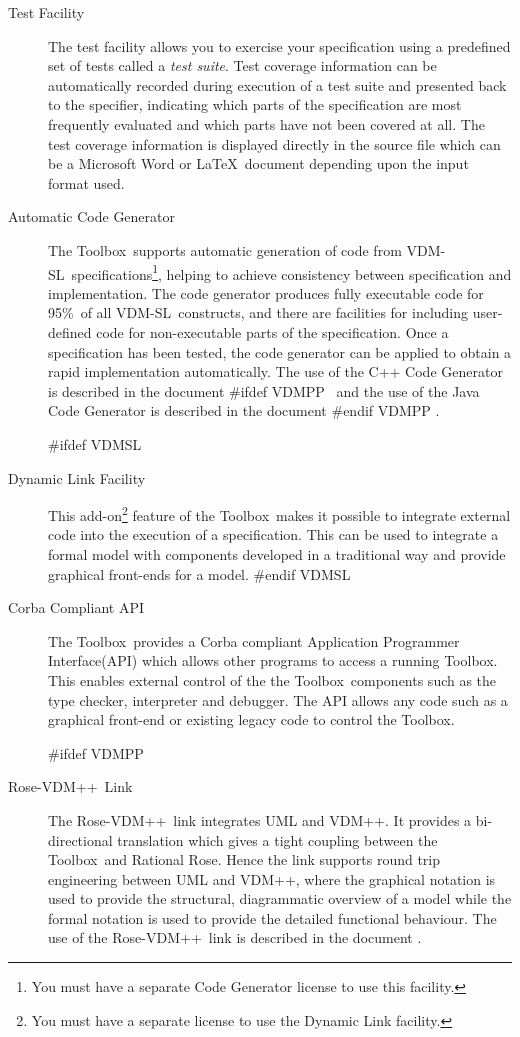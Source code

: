 \documentclass[\pformat,12pt]{article}
\def\vdmpp{{\small VDM}++}
\newcommand{\vdmslpp}{VDM-SL}
\newcommand{\Toolbox}{Toolbox}
\newcommand{\vdmslpp}{VDM++}
\newcommand{\Toolbox}{Toolbox}
\begin{document}
\begin{description}
\item[Test Facility] The test facility allows you to exercise your
  specification using a predefined set of tests called a {\em test
    suite\/}. Test coverage information can be automatically recorded
  during execution of a test suite and presented back to the
  specifier, indicating which parts of the specification are most
  frequently evaluated and which parts have not been covered at all.
  The test coverage information is displayed directly in the source
  file which can be a Microsoft Word or \LaTeX\ document depending
  upon the input format used.

\item[Automatic Code Generator] The \Toolbox\ supports automatic
  generation of  code
  from \vdmslpp\ specifications\footnote{You must have a separate Code
    Generator license to use this facility.}, helping to achieve
  consistency between specification and implementation. The code
  generator produces fully executable code for 95\%\ of all \vdmslpp\
  constructs, and there are facilities for including user-defined code
  for non-executable parts of the specification.  Once a specification
  has been tested, the code generator can be applied to obtain a rapid
  implementation automatically. The use of the C++ Code Generator is
  described in the document
#ifdef VDMPP
\ and the use of the Java Code Generator is described in the document
\cite{CGJavaManPP-CSK}%
#endif VDMPP
.

#ifdef VDMSL
\item[Dynamic Link Facility] This add-on\footnote{You must have a
    separate license to use the Dynamic Link facility.} feature of the
  \Toolbox\ makes it possible to integrate external code into the
  execution of a specification.  This can be used to integrate a
  formal model with components developed in a traditional way and
  provide graphical front-ends for a model.  
#endif VDMSL

\item[Corba Compliant API] The \Toolbox\ provides a Corba compliant
  Application Programmer Interface(API) which allows other programs
  to access a running \Toolbox. This enables external control of the
  the \Toolbox\ components such as the type checker, interpreter and
  debugger. The API allows any code such as a graphical front-end or
  existing legacy code to control the \Toolbox.

#ifdef VDMPP
\item[Rose-\vdmpp\ Link] The Rose-\vdmpp\ link integrates UML and
  \vdmpp.  It provides a bi-directional translation which gives a
  tight coupling between the \Toolbox\ and Rational Rose. Hence the
  link supports round trip engineering between UML and \vdmpp, where
  the graphical notation is used to provide the structural,
  diagrammatic overview of a model while the formal notation is used
  to provide the detailed functional behaviour. The use of
  the Rose-\vdmpp\ link is described in the document \cite{UMLMan-CSK}.


\end{description}
\end{document}

